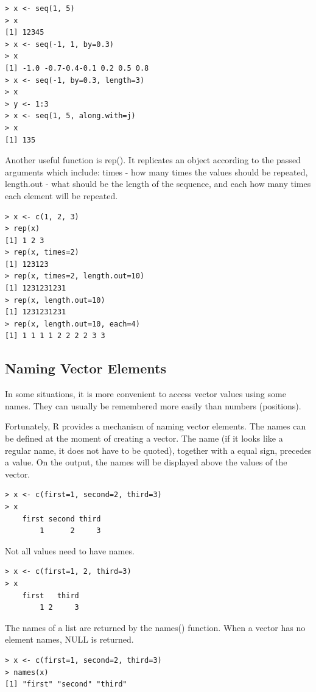 \documentclass[11pt,openany,executivepaper]{book}
\begin{document}
\begin{verbatim}
> x <- seq(1, 5)
> x
[1] 12345
> x <- seq(-1, 1, by=0.3)
> x
[1] -1.0 -0.7-0.4-0.1 0.2 0.5 0.8
> x <- seq(-1, by=0.3, length=3)
> x
> y <- 1:3
> x <- seq(1, 5, along.with=j)
> x
[1] 135
\end{verbatim}

Another useful function is rep(). It replicates an object according to the passed arguments which include: times - how many times the values should be repeated, length.out - what should be the length of the sequence, and each how many times each element will be repeated.

\begin{verbatim}
> x <- c(1, 2, 3)
> rep(x)
[1] 1 2 3
> rep(x, times=2)
[1] 123123
> rep(x, times=2, length.out=10)
[1] 1231231231
> rep(x, length.out=10)
[1] 1231231231
> rep(x, length.out=10, each=4)
[1] 1 1 1 1 2 2 2 2 3 3
\end{verbatim}


\subsection{Naming Vector Elements}
In some situations, it is more convenient to access vector values using some names. They can usually be remembered more easily than numbers (positions).

Fortunately, R provides a mechanism of naming vector elements. The names can be defined at the moment of creating a vector. The name (if it looks like a regular name, it does not have to be quoted), together with a equal sign, precedes a value. On the output, the names will be displayed above the values of the vector.

\begin{verbatim}
> x <- c(first=1, second=2, third=3)
> x
    first second third
        1      2     3
\end{verbatim}

Not all values need to have names.

\begin{verbatim}
> x <- c(first=1, 2, third=3)
> x
    first   third
        1 2     3
\end{verbatim}

The names of a list are returned by the names() function. When a vector has no element names, NULL is returned.

\begin{verbatim}
> x <- c(first=1, second=2, third=3)
> names(x)
[1] "first" "second" "third"
\end{verbatim}
\end{document}
